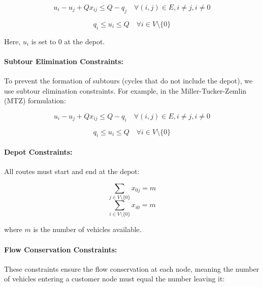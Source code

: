 \documentclass[
]{article}
\begin{document}
    \begin{equation}
        u_i - u_j + Q x_{ij} \leq Q - q_j \quad \forall (i, j) \in E, i \neq j, i \neq 0
    \end{equation}

    \begin{equation}
        q_i \leq u_i \leq Q \quad \forall i \in V \setminus \{0\}
    \end{equation}

    Here, \( u_i \) is set to 0 at the depot.

    \paragraph{Subtour Elimination Constraints:}
    To prevent the formation of subtours (cycles that do not include the depot), we use subtour elimination constraints. For example, in the Miller-Tucker-Zemlin (MTZ) formulation:

    \begin{equation}
        u_i - u_j + Q x_{ij} \leq Q - q_i \quad \forall (i, j) \in E, i \neq j, i \neq 0
    \end{equation}

    \begin{equation}
        q_i \leq u_i \leq Q \quad \forall i \in V \setminus \{0\}
    \end{equation}

    \paragraph{Depot Constraints:}
    All routes must start and end at the depot:

    \begin{equation}
        \sum_{j \in V \setminus \{0\}} x_{0j} = m
    \end{equation}
    \begin{equation}
        \sum_{i \in V \setminus \{0\}} x_{i0} = m
    \end{equation}

    where \( m \) is the number of vehicles available.

    \paragraph{Flow Conservation Constraints:}
    These constraints ensure the flow conservation at each node, meaning the number of vehicles entering a customer node must equal the number leaving it:
\end{document}

